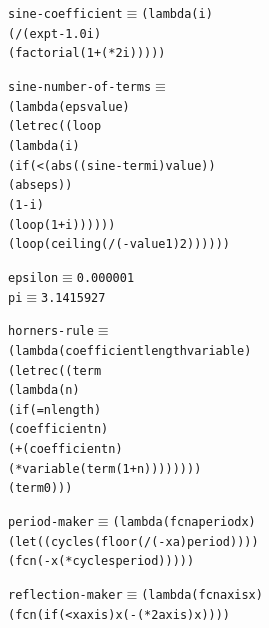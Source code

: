 \noindent\begin{minipage}{\linewidth}
\begin{alltt}
sine-coefficient \(\equiv\) (lambda (i)
                    (/ (expt -1.0 i)
                       (factorial (1+ (* 2 i)))))
\end{alltt}
\end{minipage}\par\bigskip

\noindent\begin{minipage}{\linewidth}
\begin{alltt}
sine-number-of-terms \(\equiv\)
  (lambda (eps value)
    (letrec ((loop
              (lambda (i)
                (if (< (abs ((sine-term i) value))
                       (abs eps))
                    (1- i)
                    (loop (1+ i))))))
      (loop (ceiling (/ (- value 1) 2))))))
\end{alltt}
\end{minipage}\par\bigskip

\noindent\begin{minipage}{\linewidth}
\begin{alltt}
epsilon \(\equiv\) 0.000001
pi      \(\equiv\) 3.1415927
\end{alltt}
\end{minipage}\par\bigskip

\noindent\begin{minipage}{\linewidth}
\begin{alltt}
horners-rule \(\equiv\)
  (lambda (coefficient length variable)
    (letrec ((term
              (lambda (n)
                (if (= n length)
                    (coefficient n)
                    (+ (coefficient n)
                       (* variable (term (1+ n))))))))
      (term 0)))
\end{alltt}
\end{minipage}\par\bigskip

\noindent\begin{minipage}{\linewidth}
\begin{alltt}
period-maker \(\equiv\) (lambda (fcn a period x)
                 (let ((cycles (floor (/ (- x a) period))))
                   (fcn (- x (* cycles period)))))
\end{alltt}
\end{minipage}\par\bigskip

\noindent\begin{minipage}{\linewidth}
\begin{alltt}
reflection-maker \(\equiv\) (lambda (fcn axis x)
                     (fcn (if (< x axis) x (- (* 2 axis) x))))
\end{alltt}
\end{minipage}\par\bigskip

